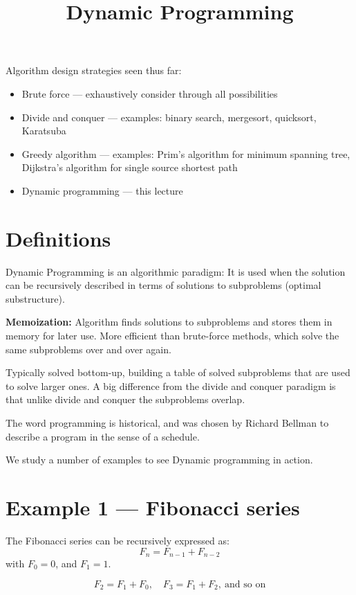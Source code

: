 \documentclass{article}
\title{Dynamic Programming}
\author{}
\date{}
\begin{document}
\maketitle

Algorithm design strategies seen thus far:
\begin{itemize}
    \item Brute force — exhaustively consider through all possibilities
    \item Divide and conquer — examples: binary search, mergesort, quicksort, Karatsuba
    \item Greedy algorithm — examples: Prim's algorithm for minimum spanning tree, Dijkstra's algorithm for single source shortest path
    \item Dynamic programming — this lecture
\end{itemize}

\section{Definitions}

Dynamic Programming is an algorithmic paradigm: It is used when the solution can be recursively described in terms of solutions to subproblems (optimal substructure).

\textbf{Memoization:} Algorithm finds solutions to subproblems and stores them in memory for later use.  
More efficient than brute-force methods, which solve the same subproblems over and over again.

Typically solved bottom-up, building a table of solved subproblems that are used to solve larger ones.  
A big difference from the divide and conquer paradigm is that unlike divide and conquer the subproblems overlap.

The word programming is historical, and was chosen by Richard Bellman to describe a program in the sense of a schedule.

We study a number of examples to see Dynamic programming in action.

\section{Example 1 — Fibonacci series}

The Fibonacci series can be recursively expressed as:
\[
F_n = F_{n-1} + F_{n-2}
\]
with \(F_0 = 0\), and \(F_1 = 1\).

\[
F_2 = F_1 + F_0,\quad F_3 = F_1 + F_2, \ \text{and so on}
\]
\end{document}
